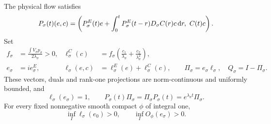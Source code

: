 \begin{proposition}
  \label{P:compact-F-projection}
  The physical flow satisfies
  \begin{equation}\label{E:compact-F-block}
    P_\sigma(t)(e,c)
    =\left(P_\sigma^E(t)e+
    \int_0^tP_\sigma^E(t-r)D_\sigma C(r)c\,\mathrm{d} r,\ C(t)c\right).
  \end{equation}
  Set
  \begin{align}
    f_\sigma&=\frac{\int V_\sigma p_\sigma}{2\lambda_\sigma}>0,
    &\ell_\sigma^C(c)&=
    f_\sigma\left(\frac{c_1}{\lambda_\sigma}
    +\frac{c_2}{\lambda_\sigma^2}\right),
    \label{E:compact-constant-dual}\\
    e_\sigma&=ie_\sigma^E,
    &\ell_\sigma(e,c)&=\ell_\sigma^E(e)+\ell_\sigma^C(c),\qquad
    \Pi_\sigma=e_\sigma\ell_\sigma,\quad Q_\sigma=I-\Pi_\sigma.
    \label{E:compact-F-projection}
  \end{align}
  These vectors, duals and rank-one projections are norm-continuous and
  uniformly bounded, and
  \begin{equation}\label{E:compact-F-eigen}
    \ell_\sigma(e_\sigma)=1,\qquad
    P_\sigma(t)\Pi_\sigma=\Pi_\sigma P_\sigma(t)
    =e^{\lambda_\sigma t}\Pi_\sigma.
  \end{equation}
  For every fixed nonnegative smooth compact $\phi$ of integral one,
  \begin{equation}\label{E:compact-positive-margins}
    \inf_I\ell_\sigma(e_0)>0,\qquad
    \inf_I O_\phi(e_\sigma)>0.
  \end{equation}
\end{proposition}

